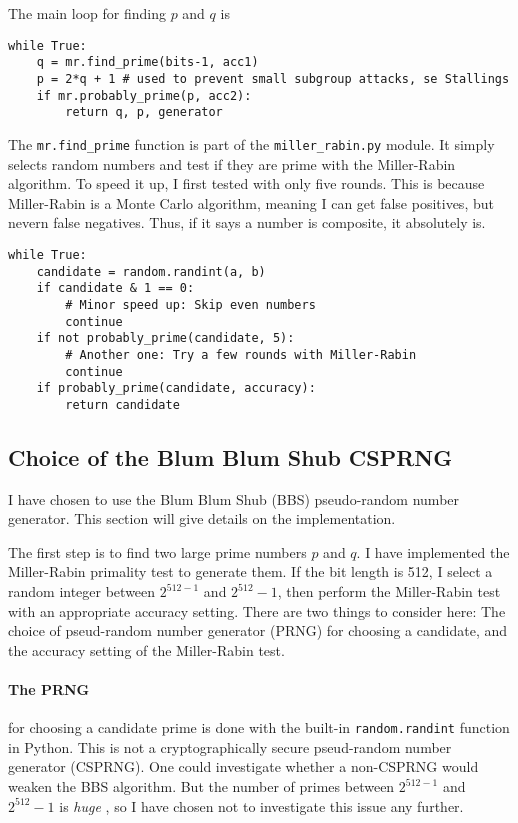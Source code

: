 \documentclass[a4paper,english,12pt]{article}
\begin{document}
The main loop for finding $p$ and $q$ is
\begin{lstlisting}[caption={Finding Diffie-Hellman parameters}, label=verb:dh.find]
while True:
    q = mr.find_prime(bits-1, acc1)
    p = 2*q + 1 # used to prevent small subgroup attacks, se Stallings
    if mr.probably_prime(p, acc2):
        return q, p, generator
\end{lstlisting}
The \texttt{mr.find\_{}prime} function is part of the \texttt{miller\_{}rabin.py}
module.  It simply selects random numbers and test if they are prime with the
Miller-Rabin algorithm. To speed it up, I first tested with only five rounds.
This is because Miller-Rabin is a Monte Carlo algorithm, meaning I can get
false positives, but nevern false negatives. Thus, if it says a number is
composite, it absolutely is.
\begin{lstlisting}[caption={Finding prime numbres}, label=verb:dh.primes]
while True:
    candidate = random.randint(a, b)
    if candidate & 1 == 0:
        # Minor speed up: Skip even numbers
        continue
    if not probably_prime(candidate, 5):
        # Another one: Try a few rounds with Miller-Rabin
        continue
    if probably_prime(candidate, accuracy):
        return candidate
\end{lstlisting}

\subsection{Choice of the Blum Blum Shub CSPRNG}
I have chosen to use the Blum Blum Shub \cite{bbs} (BBS) pseudo-random number
generator. This section will give details on the implementation.

The first step is to find two large prime numbers $p$ and $q$. I have
implemented the Miller-Rabin \cite{miller.rabin} primality test to generate
them.
%
If the bit length is 512, I select a random integer between $2^{512-1}$ and
$2^{512}-1$, then perform the Miller-Rabin test with an appropriate accuracy
setting. There are two things to consider here: The choice of pseud-random
number generator (PRNG) for choosing a candidate, and the accuracy setting of
the Miller-Rabin test.

\paragraph{The PRNG} for choosing a candidate prime is done with the built-in
\texttt{random.randint} function in Python. This is not a cryptographically
secure pseud-random number generator (CSPRNG). One could investigate whether a
non-CSPRNG would weaken the BBS algorithm. But the number of primes between
$2^{512-1}$ and $2^{512}-1$ is \textit{huge} \cite{wiki:prime.counting}, so I
have chosen not to investigate this issue any further.
\end{document}
